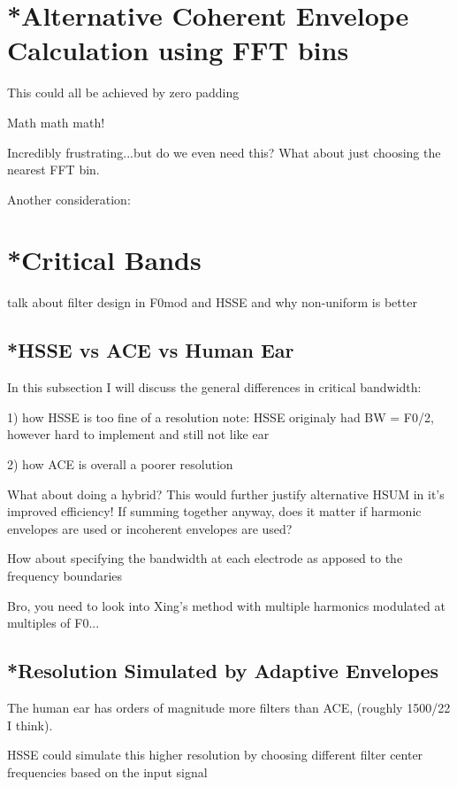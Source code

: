 \documentclass [11pt, proquest] {uwthesis}[2015/03/03]
\begin{document}
\section{*Alternative Coherent Envelope Calculation using FFT bins}

This could all be achieved by zero padding

Math math math!

Incredibly frustrating...but do we even need this?  What about just choosing the nearest FFT bin.

Another consideration: 

\section{*Critical Bands}

talk about filter design in F0mod and HSSE and why non-uniform is better

\subsection{*HSSE vs ACE vs Human Ear}

In this subsection I will discuss the general differences in critical bandwidth:

1) how HSSE is too fine of a resolution
note: HSSE originaly had BW = F0/2, however hard to implement and still not like ear

2) how ACE is overall a poorer resolution

What about doing a hybrid?  This would further justify alternative HSUM in it's improved efficiency!  If summing together anyway, does it matter if harmonic envelopes are used or incoherent envelopes are used?

How about specifying the bandwidth at each electrode as apposed to the frequency boundaries

Bro, you need to look into Xing's method with multiple harmonics modulated at multiples of F0...


\subsection{*Resolution Simulated by Adaptive Envelopes}

The human ear has orders of magnitude more filters than ACE, (roughly 1500/22 I think).

HSSE could simulate this higher resolution by choosing different filter center frequencies based on the input signal
\end{document}
